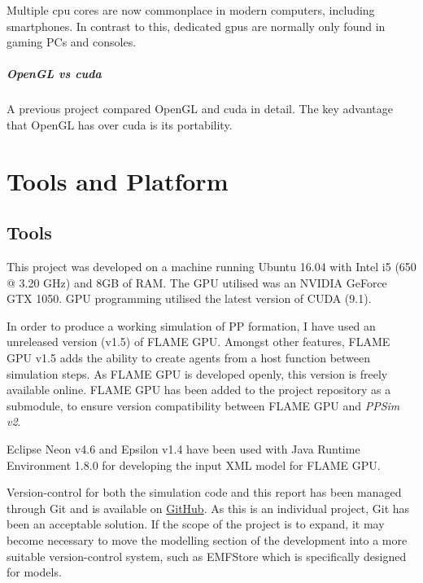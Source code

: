 \documentclass{UoYCSproject}
\begin{document}

Multiple \acrshort{cpu} cores are now commonplace in modern computers, including smartphones.
In contrast to this, dedicated \acrshort{gpu}s are normally only found in gaming PCs and consoles.

\paragraph{OpenGL vs \acrshort{cuda}}
A previous project compared OpenGL and \acrshort{cuda} in detail.
The key advantage that OpenGL has over \acrshort{cuda} is its portability.

\chapter{Tools and Platform}
\section{Tools}
This project was developed on a machine running Ubuntu 16.04 with Intel i5 (650 @ 3.20 GHz) and 8GB of RAM.
The GPU utilised was an NVIDIA GeForce GTX 1050.
GPU programming utilised the latest version of CUDA (9.1).

In order to produce a working simulation of \gls{PP} formation, I have used an unreleased version (v1.5) of \gls{FLAME GPU}.
Amongst other features, \gls{FLAME GPU} v1.5 adds the ability to create agents from a host function between simulation steps.
As \gls{FLAME GPU} is developed openly, this version is freely available online\cite{flame_github}.
\gls{FLAME GPU} has been added to the project repository as a submodule, to ensure version compatibility between \gls{FLAME GPU} and \textit{PPSim v2}.

Eclipse Neon v4.6 and Epsilon v1.4 have been used with Java Runtime Environment 1.8.0 for developing the input XML model for \gls{FLAME GPU}.

Version-control for both the simulation code and this report has been managed through Git and is available on \href{https://github.com/oliver-binns/PRIY.git}{GitHub}.
As this is an individual project, Git has been an acceptable solution.
If the scope of the project is to expand, it may become necessary to move the modelling section of the development into a more suitable version-control system, such as EMFStore\cite{emf_store} which is specifically designed for models.
\end{document}
